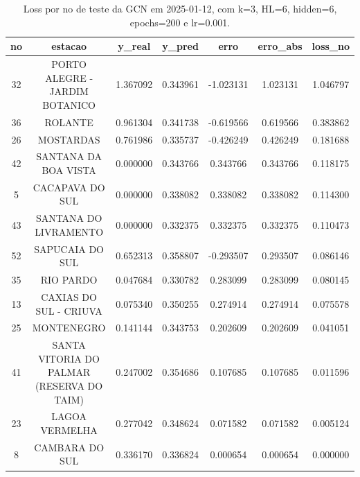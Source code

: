 \begin{table}[h]
\centering
\caption{Loss por no de teste da GCN em 2025-01-12, com k=3, HL=6, hidden=6, epochs=200 e lr=0.001.}
\label{tab:gcn_loss_k3_hl6_h6_e200_d20250112}
\begin{tabular}{ccccccc}
\toprule
no & estacao & y\_real & y\_pred & erro & erro\_abs & loss\_no \\
\midrule
32 & PORTO ALEGRE - JARDIM BOTANICO & 1.367092 & 0.343961 & -1.023131 & 1.023131 & 1.046797 \\
36 & ROLANTE & 0.961304 & 0.341738 & -0.619566 & 0.619566 & 0.383862 \\
26 & MOSTARDAS & 0.761986 & 0.335737 & -0.426249 & 0.426249 & 0.181688 \\
42 & SANTANA DA BOA VISTA & 0.000000 & 0.343766 & 0.343766 & 0.343766 & 0.118175 \\
5 & CACAPAVA DO SUL & 0.000000 & 0.338082 & 0.338082 & 0.338082 & 0.114300 \\
43 & SANTANA DO LIVRAMENTO & 0.000000 & 0.332375 & 0.332375 & 0.332375 & 0.110473 \\
52 & SAPUCAIA DO SUL & 0.652313 & 0.358807 & -0.293507 & 0.293507 & 0.086146 \\
35 & RIO PARDO & 0.047684 & 0.330782 & 0.283099 & 0.283099 & 0.080145 \\
13 & CAXIAS DO SUL - CRIUVA & 0.075340 & 0.350255 & 0.274914 & 0.274914 & 0.075578 \\
25 & MONTENEGRO & 0.141144 & 0.343753 & 0.202609 & 0.202609 & 0.041051 \\
41 & SANTA VITORIA DO PALMAR (RESERVA DO TAIM) & 0.247002 & 0.354686 & 0.107685 & 0.107685 & 0.011596 \\
23 & LAGOA VERMELHA & 0.277042 & 0.348624 & 0.071582 & 0.071582 & 0.005124 \\
8 & CAMBARA DO SUL & 0.336170 & 0.336824 & 0.000654 & 0.000654 & 0.000000 \\
\bottomrule
\end{tabular}
\end{table}
